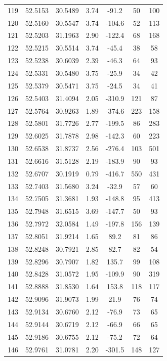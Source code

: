 \begin{longtable}{ccccccc}
119 & 52.5153 & 30.5489 & 3.74 & -91.2 & 50 & 100 \\
120 & 52.5160 & 30.5547 & 3.74 & -104.6 & 52 & 113 \\
121 & 52.5203 & 31.1963 & 2.90 & -122.4 & 68 & 168 \\
122 & 52.5215 & 30.5514 & 3.74 & -45.4 & 38 & 58 \\
123 & 52.5238 & 30.6039 & 2.39 & -46.3 & 64 & 93 \\
124 & 52.5331 & 30.5480 & 3.75 & -25.9 & 34 & 42 \\
125 & 52.5379 & 30.5471 & 3.75 & -24.5 & 34 & 41 \\
126 & 52.5403 & 31.4094 & 2.05 & -310.9 & 121 & 87 \\
127 & 52.5764 & 30.9263 & 1.89 & -374.6 & 223 & 158 \\
128 & 52.5801 & 31.7726 & 2.77 & -199.5 & 86 & 283 \\
129 & 52.6025 & 31.7878 & 2.98 & -142.3 & 60 & 223 \\
130 & 52.6538 & 31.8737 & 2.56 & -276.4 & 103 & 501 \\
131 & 52.6616 & 31.5128 & 2.19 & -183.9 & 90 & 93 \\
132 & 52.6707 & 30.1919 & 0.79 & -416.7 & 550 & 431 \\
133 & 52.7403 & 31.5680 & 3.24 & -32.9 & 57 & 60 \\
134 & 52.7505 & 31.3681 & 1.93 & -148.8 & 95 & 413 \\
135 & 52.7948 & 31.6515 & 3.69 & -147.7 & 50 & 93 \\
136 & 52.7972 & 32.0584 & 1.49 & -197.8 & 156 & 139 \\
137 & 52.8051 & 31.9214 & 1.65 & 89.2 & 81 & 86 \\
138 & 52.8248 & 30.7921 & 2.85 & 82.7 & 82 & 54 \\
139 & 52.8296 & 30.7907 & 1.82 & 135.7 & 99 & 108 \\
140 & 52.8428 & 31.0572 & 1.95 & -109.9 & 90 & 319 \\
141 & 52.8888 & 31.8530 & 1.64 & 153.8 & 118 & 117 \\
142 & 52.9096 & 31.9073 & 1.99 & 21.9 & 76 & 74 \\
143 & 52.9134 & 30.6760 & 2.12 & -76.9 & 73 & 65 \\
144 & 52.9144 & 30.6719 & 2.12 & -66.9 & 66 & 65 \\
145 & 52.9186 & 30.6755 & 2.12 & -75.2 & 72 & 64 \\
146 & 52.9761 & 31.0781 & 2.20 & -301.5 & 148 & 127 \\

\end{longtable}
